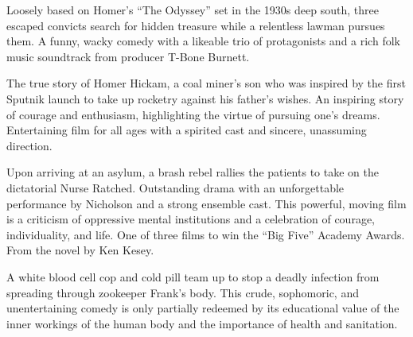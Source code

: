   Loosely based on Homer's ``The Odyssey'' set in the 1930s deep south, three escaped convicts search for hidden treasure while a relentless lawman pursues them. A funny, wacky comedy with a likeable trio of protagonists and a rich folk music soundtrack from producer T-Bone Burnett. \author{DW} 

   The true story of Homer Hickam, a coal miner's son who was inspired by the first Sputnik launch to take up rocketry against his father's wishes. An inspiring story of courage and enthusiasm, highlighting the virtue of pursuing one's dreams. Entertaining film for all ages with a spirited cast and sincere, unassuming direction. \author{DW} 

   Upon arriving at an asylum, a brash rebel rallies the patients to take on the dictatorial Nurse Ratched. Outstanding drama with an unforgettable performance by Nicholson and a strong ensemble cast. This powerful, moving film is a criticism of oppressive mental institutions and a celebration of courage, individuality, and life. One of three films to win the ``Big Five'' Academy Awards. From the novel by Ken Kesey. \author{DW} 

   A white blood cell cop and cold pill team up to stop a deadly infection from spreading through zookeeper Frank's body. This crude, sophomoric, and unentertaining comedy is only partially redeemed by its educational value of the inner workings of the human body and the importance of health and sanitation. \author{DW} 
